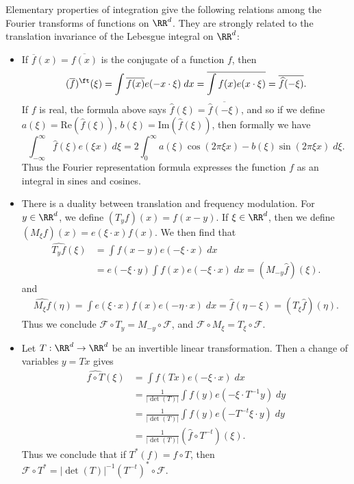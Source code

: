 Elementary properties of integration give the following relations among the Fourier transforms of functions on $\RR^d$. They are strongly related to the translation invariance of the Lebesgue integral on $\RR^d$:
%
\begin{itemize}
	\item If $\overline{f}(x) = \overline{f(x)}$ is the conjugate of a function $f$, then
	\[ (\overline{f})^\ft(\xi) = \int \overline{f(x)} e(- x \cdot \xi)\; dx = \overline{\int f(x) e(x \cdot \xi)} = \overline{\widehat{f}(-\xi)}. \]
	If $f$ is real, the formula above says $\widehat{f}(\xi) = \overline{\widehat{f}(-\xi)}$, and so if we define $a(\xi) = \text{Re}(\widehat{f}(\xi))$, $b(\xi) = \text{Im}(\widehat{f}(\xi))$, then formally we have
	\[ \int_{-\infty}^\infty \widehat{f}(\xi) e(\xi x)\; d\xi = 2 \int_0^\infty a(\xi) \cos(2 \pi \xi x) - b(\xi) \sin(2 \pi \xi x)\; d\xi. \]
	Thus the Fourier representation formula expresses the function $f$ as an integral in sines and cosines.
	
	\item There is a duality between translation and frequency modulation. For $y \in \RR^d$, we define $(T_y f)(x) = f(x - y)$. If $\xi \in \RR^d$, then we define $(M_\xi f)(x) = e(\xi \cdot x) f(x)$. We then find that
	\begin{align*}
		\widehat{T_y f}(\xi) &= \int f(x - y) e(- \xi \cdot x)\; dx\\
		&= e(- \xi \cdot y) \int f(x) e(- \xi \cdot x)\; dx = (M_{-y} \widehat{f})(\xi).
	\end{align*}
	and
	\begin{align*}
		\widehat{M_\xi f}(\eta) = \int e(\xi \cdot x) f(x) e(- \eta \cdot x)\; dx = \widehat{f}(\eta - \xi) = (T_\xi \widehat{f})(\eta).
	\end{align*}
	Thus we conclude $\mathcal{F} \circ T_y = M_{-y} \circ \mathcal{F}$, and $\mathcal{F} \circ M_\xi = T_\xi \circ \mathcal{F}$.

	\item Let $T: \RR^d \to \RR^d$ be an invertible linear transformation. Then a change of variables $y = Tx$ gives
	\begin{align*}
		\widehat{f \circ T}(\xi) &= \int f(Tx) e(-\xi \cdot x)\; dx\\
		&= \frac{1}{|\det(T)|} \int f(y) e(- \xi \cdot T^{-1}y)\; dy\\
		&= \frac{1}{|\det(T)|} \int f(y) e(- T^{-t} \xi \cdot y)\; dy\\
		&= \frac{1}{|\det(T)|} (\widehat{f} \circ T^{-t})(\xi).
	\end{align*}
	Thus we conclude that if $T^*(f) = f \circ T$, then $\mathcal{F} \circ T^* = |\det(T)|^{-1} (T^{-t})^* \circ \mathcal{F}$.


\end{itemize}
